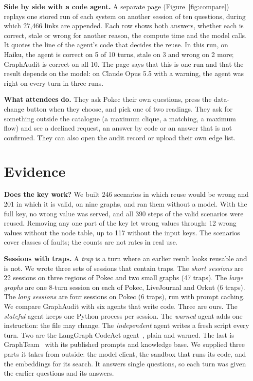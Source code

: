 \documentclass[sigconf,9pt]{acmart}
\newcommand{\sys}{GraphAudit}
\begin{document}
\textbf{Side by side with a code agent.} A separate page (Figure~\ref{fig:compare}) replays one stored run
of each system on another session of ten questions, during which 27,466 links are appended. Each row shows both answers, whether each is correct, stale or wrong
for another reason, the compute time and the model calls. It quotes the line of the agent's code that decides the reuse. In this run, on Haiku, the agent is correct on 5 of 10 turns, stale on 3
and wrong on 2 more; \sys{} is correct on all 10.  The page says that this is one run and that the
result depends on the model: on Claude Opus 5.5 with a warning, the agent was
right on every turn in three runs.

\textbf{What attendees do.} They ask Pokec their own questions, press the data-change button when they
choose, and pick one of two readings. They ask for something outside the catalogue (a maximum
clique, a matching, a maximum flow) and see a declined request, an answer by code or an answer that is not
confirmed. They can also open the audit record or upload their own edge list.

\section{Evidence}
\label{sec:evidence}

\textbf{Does the key work?} We built 246 scenarios in which reuse would be wrong and 201 in which it is
valid, on nine graphs, and ran them without a model. With the full key, no wrong value was served, and all
390 steps of the valid scenarios were reused. Removing any one part of the key let wrong values through: 12 wrong values without the
node table, up to 117 without the input keys. The scenarios cover classes of faults; the
counts are not rates in real use.

\textbf{Sessions with traps.} A \emph{trap} is a turn where an earlier result looks reusable and is not.
We wrote three sets of sessions that contain traps. The \emph{short sessions} are 22 sessions on three
regions of Pokec and two small graphs (47 traps). The \emph{large graphs} are one 8-turn session on
each of Pokec, LiveJournal and Orkut (6 traps). The \emph{long sessions} are four sessions on Pokec (6
traps), run with prompt caching.
We compare \sys{} with six agents that write code. Three are ours. The \emph{stateful} agent keeps one
Python process per session. The \emph{warned} agent adds one instruction: the file may change. The
\emph{independent} agent writes a fresh script every turn. Two are the LangGraph CodeAct
agent~\cite{codeact}, plain and warned. The last is GraphTeam~\cite{graphteam} with its published prompts
and knowledge base. We supplied three parts it takes from outside: the model client, the sandbox that
runs its code, and the embeddings for its search. It answers single questions, so each turn was given the
earlier questions and its answers.
\end{document}
